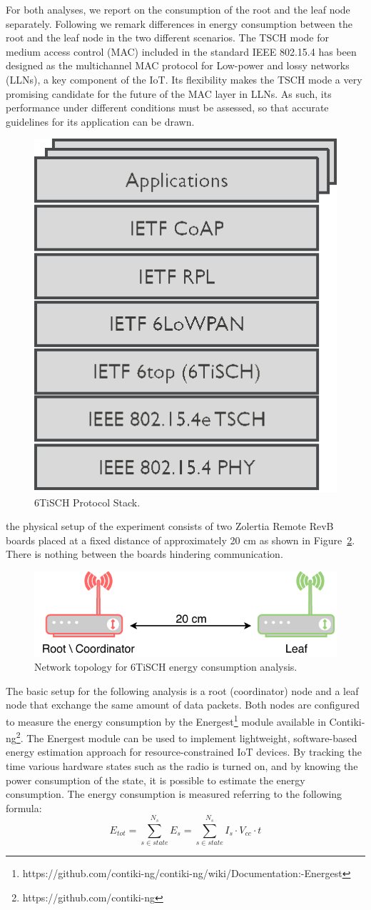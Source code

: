 \documentclass[conference]{IEEEtran}
\newcommand{\figref}[1]{Figure~\ref{#1}}
\renewcommand\_{\textunderscore\allowbreak}
\begin{document}
For both analyses, we report on the consumption of the root and the leaf node separately.
Following we remark differences in energy consumption between the root and the leaf node in the two different scenarios.
The TSCH mode for medium access control (MAC) included in the standard IEEE 802.15.4 has been designed as the multichannel MAC protocol for Low-power and lossy networks (LLNs), a key component of the IoT. Its ﬂexibility makes the TSCH mode a very promising candidate for the future of the MAC layer in LLNs. As such, its performance under different conditions must be assessed, so that accurate guidelines for its application can be drawn\cite{TSCHExperimentEval}.
\begin{figure}[htbp]
	\centering
	\includegraphics[width=.25\textwidth,keepaspectratio]{figures/6TiSCH-Protocol-Stack.png}
	\caption{6TiSCH Protocol Stack\cite{TimeCritical6tisch}.}
	\label{fig:6tischStack}
\end{figure}


the physical setup of the experiment consists of two Zolertia  Remote RevB boards placed at a fixed distance of approximately 20 cm as shown in \figref{fig:exp1Topology}. There is nothing between the boards hindering communication.

\begin{figure}[htbp]
	\centering
	\includegraphics[width=.35\textwidth,keepaspectratio]{figures/exp1Topology.pdf}
	\caption{Network topology for 6TiSCH energy consumption analysis.}
	\label{fig:exp1Topology}
\end{figure}
The basic setup for the following analysis is a root (coordinator) node and a leaf node that exchange the same amount of data packets.
Both nodes are configured to measure the energy consumption by the Energest\footnote{https://github.com/contiki-ng/contiki-ng/wiki/Documentation:-Energest} module available in Contiki-ng\footnote{https://github.com/contiki-ng}.
The Energest module can be used to implement lightweight, software-based energy estimation approach for resource-constrained IoT devices. By tracking the time various hardware states such as the radio is turned on, and by knowing the power consumption of the state, it is possible to estimate the energy consumption\cite{contiki-NGWiki}.
The energy consumption is measured referring to the following formula:
\begin{equation}
	E_{tot}=\sum_{s \in state}^{N_{s}}E_{s}=\sum_{s \in state}^{N_{s}}I_s  \cdot V_{cc} \cdot t
\end{equation}
\end{document}
